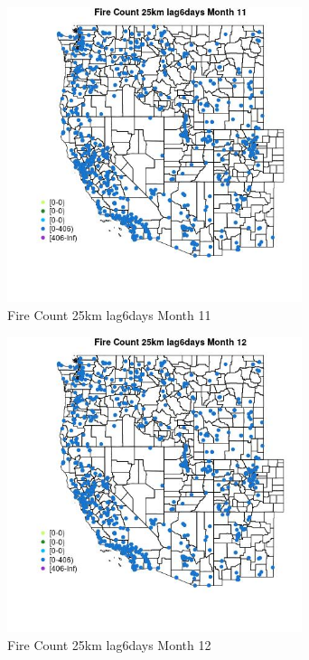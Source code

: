\begin{figure} 
\centering  
\includegraphics[width=0.77\textwidth]{Code_Outputs/Report_ML_input_PM25_Step4_part_f_de_duplicated_aves_prioritize_24hr_obswNAs_MapObsMo11Fire_Count_25km_lag6days.jpg} 
\caption{\label{fig:Report_ML_input_PM25_Step4_part_f_de_duplicated_aves_prioritize_24hr_obswNAsMapObsMo11Fire_Count_25km_lag6days}Fire Count 25km lag6days Month 11} 
\end{figure} 
 

\begin{figure} 
\centering  
\includegraphics[width=0.77\textwidth]{Code_Outputs/Report_ML_input_PM25_Step4_part_f_de_duplicated_aves_prioritize_24hr_obswNAs_MapObsMo12Fire_Count_25km_lag6days.jpg} 
\caption{\label{fig:Report_ML_input_PM25_Step4_part_f_de_duplicated_aves_prioritize_24hr_obswNAsMapObsMo12Fire_Count_25km_lag6days}Fire Count 25km lag6days Month 12} 
\end{figure} 
 


